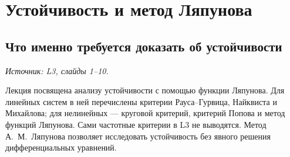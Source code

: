 \section{Устойчивость и метод Ляпунова}
\label{sec:stability}

\subsection{Что именно требуется доказать об устойчивости}
\label{subsec:stability-definitions}
\noindent\textit{Источник: L3, слайды 1--10.}

Лекция посвящена анализу устойчивости с помощью функции Ляпунова.
Для линейных систем в ней перечислены критерии Рауса--Гурвица,
Найквиста и Михайлова; для нелинейных --- круговой критерий,
критерий Попова и метод функций Ляпунова. Сами частотные критерии
в L3 не выводятся. Метод А. М. Ляпунова позволяет исследовать
устойчивость без явного решения дифференциальных уравнений.

